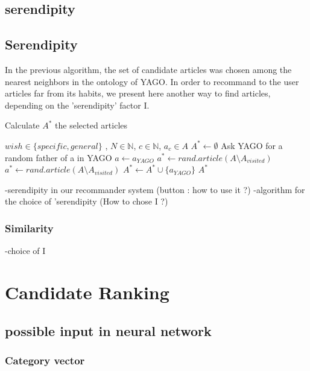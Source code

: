 \documentclass[11pt]{article}
\theoremstyle{plain}
\theoremstyle{definition}
\theoremstyle{remark}
\begin{document}
\newpage
\subsection{serendipity}
\subsection{Serendipity}

In the previous algorithm, the set of candidate articles was chosen among the nearest neighbors in the ontology of YAGO.
In order to recommand to the user articles far from its habits, we present here another way to find articles, depending on the 'serendipity' factor I.
\begin{algorithm}
  \caption{Calculate $A^*$ the selected articles}
  \begin{algorithmic}
    \REQUIRE $wish \in \{specific , general\}$ , $N \in \mathbb{N}$, $c \in \mathbb{N}$, $a_c\in A$
    \STATE $A^* \leftarrow \emptyset$
    \STATE Ask YAGO for a random father of a in YAGO 
    \STATE $a \leftarrow a_{YAGO}$ 
    \ENDWHILE
    \STATE $a^* \leftarrow rand.article(A\setminus A_{visited})$
    \STATE $a^*\leftarrow rand.article(A\setminus A_{visited})$
    \ENDWHILE
    \STATE $ A^* \leftarrow A^* \cup \{a_{YAGO}\}$
    \ENDWHILE
    \RETURN $A^*$
  \end{algorithmic}
\end{algorithm}

-serendipity in our recommander system (button : how to use it ?)
-algorithm for the choice of 'serendipity (How to chose I ?)
\subsubsection{Similarity}

-choice of I


\section{Candidate Ranking}

\subsection{possible input in neural network}

\subsubsection{Category vector}
\end{document}
